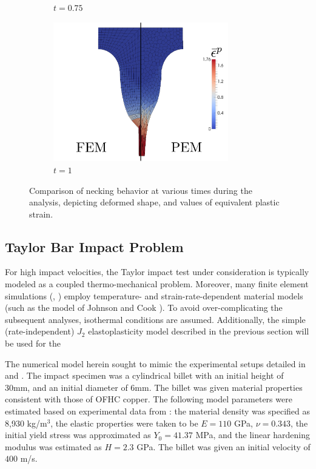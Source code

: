 \begin{figure}[!h]
\begin{subfigure}[b]{0.49\linewidth}
    			\caption{$t=0.75$ \label{fig:necking_eqps_2}}
    \end{subfigure}
	\begin{subfigure}[b]{0.49\linewidth}
            \centering
            \includegraphics[width=3.0in]{figures/necking_eqps_3.pdf}
    			\caption{$t=1$ \label{fig:necking_eqps_3}}
    \end{subfigure}
    \caption{Comparison of necking behavior at various times during the analysis, depicting deformed shape, and values of equivalent plastic strain.}
\end{figure}

\subsection*{Taylor Bar Impact Problem}



For high impact velocities, the Taylor impact test under consideration is typically modeled as a coupled thermo-mechanical problem. Moreover, many finite element simulations (\cite{Heinstein:05}, \cite{Banerjee:05}) employ temperature- and strain-rate-dependent material models (such as the model of Johnson and Cook \cite{Johnson&Cook:83}). To avoid over-complicating the subsequent analyses, isothermal conditions are assumed. Additionally, the simple (rate-independent) $J_2$ elastoplasticity model described in the previous section will be used for the 

The numerical model herein sought to mimic the experimental setups detailed in \cite{Johnson&Cook:83} and \cite{Gust:82}. The impact specimen was a cylindrical billet with an initial height of 30mm, and an initial diameter of 6mm. The billet was given material properties consistent with those of OFHC copper. The following model parameters were estimated based on experimental data from \cite{Hecker:73}: the material density was specified as 8,930 kg/$\text{m}^3$, the elastic properties were taken to be $E = 110$ GPa, $\nu = 0.343$, the initial yield stress was approximated as $Y_0 = 41.37$ MPa, and the linear hardening modulus was estimated as $H = 2.3$ GPa. The billet was given an initial velocity of $400$ m/s.

